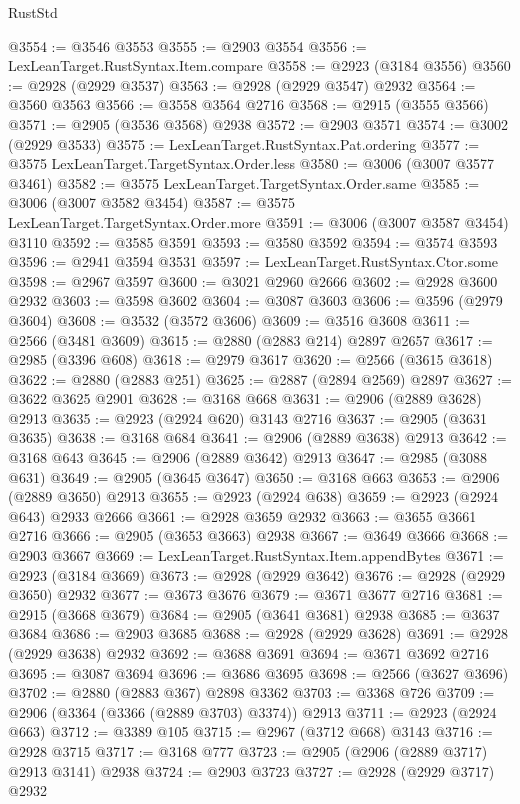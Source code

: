 \begin{lexlean}{RustStd}
\begin{coremodule}
@3554 := @3546 @3553
@3555 := @2903 @3554
@3556 := LexLeanTarget.RustSyntax.Item.compare
@3558 := @2923 (@3184 @3556)
@3560 := @2928 (@2929 @3537)
@3563 := @2928 (@2929 @3547) @2932
@3564 := @3560 @3563
@3566 := @3558 @3564 @2716
@3568 := @2915 (@3555 @3566)
@3571 := @2905 (@3536 @3568) @2938
@3572 := @2903 @3571
@3574 := @3002 (@2929 @3533)
@3575 := LexLeanTarget.RustSyntax.Pat.ordering
@3577 := @3575 LexLeanTarget.TargetSyntax.Order.less
@3580 := @3006 (@3007 @3577 @3461)
@3582 := @3575 LexLeanTarget.TargetSyntax.Order.same
@3585 := @3006 (@3007 @3582 @3454)
@3587 := @3575 LexLeanTarget.TargetSyntax.Order.more
@3591 := @3006 (@3007 @3587 @3454) @3110
@3592 := @3585 @3591
@3593 := @3580 @3592
@3594 := @3574 @3593
@3596 := @2941 @3594 @3531
@3597 := LexLeanTarget.RustSyntax.Ctor.some
@3598 := @2967 @3597
@3600 := @3021 @2960 @2666
@3602 := @2928 @3600 @2932
@3603 := @3598 @3602
@3604 := @3087 @3603
@3606 := @3596 (@2979 @3604)
@3608 := @3532 (@3572 @3606)
@3609 := @3516 @3608
@3611 := @2566 (@3481 @3609)
@3615 := @2880 (@2883 @214) @2897 @2657
@3617 := @2985 (@3396 @608)
@3618 := @2979 @3617
@3620 := @2566 (@3615 @3618)
@3622 := @2880 (@2883 @251)
@3625 := @2887 (@2894 @2569) @2897
@3627 := @3622 @3625 @2901
@3628 := @3168 @668
@3631 := @2906 (@2889 @3628) @2913
@3635 := @2923 (@2924 @620) @3143 @2716
@3637 := @2905 (@3631 @3635)
@3638 := @3168 @684
@3641 := @2906 (@2889 @3638) @2913
@3642 := @3168 @643
@3645 := @2906 (@2889 @3642) @2913
@3647 := @2985 (@3088 @631)
@3649 := @2905 (@3645 @3647)
@3650 := @3168 @663
@3653 := @2906 (@2889 @3650) @2913
@3655 := @2923 (@2924 @638)
@3659 := @2923 (@2924 @643) @2933 @2666
@3661 := @2928 @3659 @2932
@3663 := @3655 @3661 @2716
@3666 := @2905 (@3653 @3663) @2938
@3667 := @3649 @3666
@3668 := @2903 @3667
@3669 := LexLeanTarget.RustSyntax.Item.appendBytes
@3671 := @2923 (@3184 @3669)
@3673 := @2928 (@2929 @3642)
@3676 := @2928 (@2929 @3650) @2932
@3677 := @3673 @3676
@3679 := @3671 @3677 @2716
@3681 := @2915 (@3668 @3679)
@3684 := @2905 (@3641 @3681) @2938
@3685 := @3637 @3684
@3686 := @2903 @3685
@3688 := @2928 (@2929 @3628)
@3691 := @2928 (@2929 @3638) @2932
@3692 := @3688 @3691
@3694 := @3671 @3692 @2716
@3695 := @3087 @3694
@3696 := @3686 @3695
@3698 := @2566 (@3627 @3696)
@3702 := @2880 (@2883 @367) @2898 @3362
@3703 := @3368 @726
@3709 := @2906 (@3364 (@3366 (@2889 @3703) @3374)) @2913
@3711 := @2923 (@2924 @663)
@3712 := @3389 @105
@3715 := @2967 (@3712 @668) @3143
@3716 := @2928 @3715
@3717 := @3168 @777
@3723 := @2905 (@2906 (@2889 @3717) @2913 @3141) @2938
@3724 := @2903 @3723
@3727 := @2928 (@2929 @3717) @2932

\end{coremodule}
\end{lexlean}

